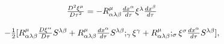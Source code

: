 \begin{equation}
\begin{array}{c}
\frac{D^{2}\xi ^{\mu }}{D\tau ^{2}}=-R_{\alpha \lambda \beta }^{\mu }\frac{%
dx^{\alpha }}{d\tau }\xi ^{\lambda }\frac{dx^{\beta }}{d\tau } \\ 
\\ 
-\frac{1}{2}[R_{\alpha \lambda \beta }^{\mu }\frac{D\xi ^{\alpha }}{D\tau }%
S^{\lambda \beta }+R_{\alpha \lambda \beta }^{\mu }\frac{dx^{\alpha }}{d\tau 
}S^{\lambda \beta };_{\gamma }\xi ^{\gamma }+R_{\alpha \lambda \beta }^{\mu
};_{\sigma }\xi ^{\sigma }\frac{dx^{\alpha }}{d\tau }S^{\lambda \beta }],
\end{array}
\label{28}
\end{equation}


